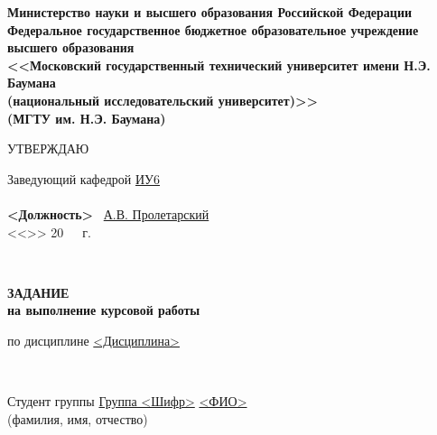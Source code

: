 \documentclass[utf8x, 11pt, oneside, a4paper]{article}
\begin{document}
	\thispagestyle{empty}
	\begin{center}
		\fontsize{11pt}{0.3\baselineskip}\selectfont \textbf{Министерство науки и высшего образования Российской Федерации 
		\\ Федеральное государственное бюджетное образовательное учреждение 
		\\ высшего образования 
		\\ <<Московский государственный технический университет имени Н.Э. Баумана
		\\ (национальный исследовательский университет)>>
		\\ (МГТУ им. Н.Э. Баумана)}
		
		\fontsize{12pt}{0.5\baselineskip}\selectfont
		\noindent \makebox[\linewidth]{\rule{\textwidth}{4pt}} \makebox[\linewidth]{\rule{\textwidth}{1pt}}
	\end{center}	
	
	\begin{flushright}
		\fontsize{12pt}{\baselineskip}\selectfont
		УТВЕРЖДАЮ \hspace*{1.4cm}

		\fontsize{12pt}{\baselineskip}\selectfont
		Заведующий кафедрой \uline{\hspace*{0.5cm}}\uline{ИУ6}\uline{\hspace*{0.5cm}} 
		\\ \
		\\ \hfill \textbf{<Должность>} \uline{\hspace*{2.5cm}} \ \uline{А.В. Пролетарский} 
		\\ <<\uline{\hspace*{1cm}}>> \uline{\hspace*{2.5cm}} 20\ \ \   г. %
	\end{flushright}
	\
	\begin{center}
		\fontsize{18pt}{\baselineskip}\selectfont \textbf{ЗАДАНИЕ}
		\\ \fontsize{16pt}{\baselineskip}\selectfont \textbf{на выполнение курсовой работы}
	\end{center}

	\normalsize

	\begin{flushleft}
		по дисциплине  \uline{\hspace*{0.5cm}}\uline{<Дисциплина>}\uline{\hspace*{0.5cm}}
		
		\

		Студент группы  \uline{\hspace*{0.5cm}}\uline{Группа <Шифр>}\uline{\hspace*{0.5cm}}
		\center \uline{\hfill <ФИО> \hfill} 
		\\ \fontsize{10pt}{\baselineskip}\selectfont(фамилия, имя, отчество)
	\end{flushleft}
\end{document}
